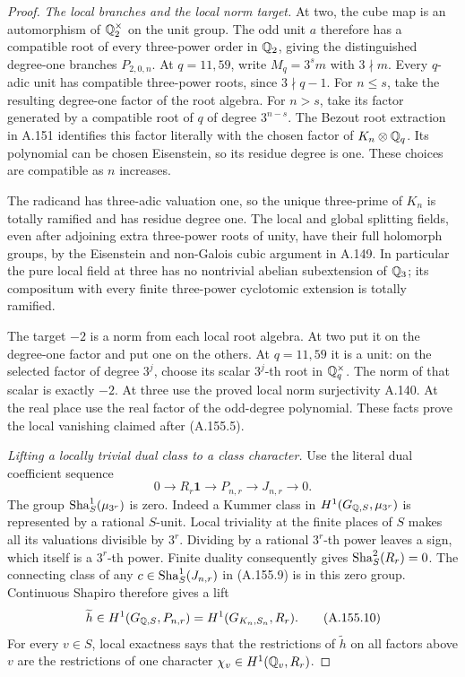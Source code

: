\begin{proof}
\emph{The local branches and the local norm target.}
At two, the cube map is an automorphism of \(\mathbb Q_2^\times\)
on the unit group.  The odd unit \(a\) therefore has a compatible
root of every three-power order in \(\mathbb Q_2\), giving the distinguished
degree-one branches \(P_{2,0,n}\).
At \(q=11,59\), write \(M_q=3^s m\) with \(3\nmid m\).
Every \(q\)-adic unit has compatible three-power roots, since
\(3\nmid q-1\).
For \(n\leq s\), take the resulting degree-one factor of the
root algebra.  For \(n>s\), take its factor generated by a compatible
root of \(q\) of degree \(3^{n-s}\).
The Bezout root extraction in A.151 identifies this factor literally
with the chosen factor of \(K_n\otimes\mathbb Q_q\).
Its polynomial can be chosen Eisenstein, so its residue degree is
one.  These choices are compatible as \(n\) increases.

The radicand has three-adic valuation one, so the unique three-prime
of \(K_n\) is totally ramified and has residue degree one.
The local and global splitting fields, even after adjoining extra
three-power roots of unity, have their full holomorph groups, by the
Eisenstein and non-Galois cubic argument in A.149.
In particular the pure local field at three has no nontrivial
abelian subextension of \(\mathbb Q_3\); its compositum with every finite
three-power cyclotomic extension is totally ramified.

The target \(-2\) is a norm from each local root algebra.
At two put it on the degree-one factor and put one on the others.
At \(q=11,59\) it is a unit: on the selected factor of degree
\(3^j\), choose its scalar \(3^j\)-th root in \(\mathbb Q_q^\times\).
The norm of that scalar is exactly \(-2\).
At three use the proved local norm surjectivity A.140.
At the real place use the real factor of the odd-degree polynomial.
These facts prove the local vanishing claimed after (A.155.5).

\emph{Lifting a locally trivial dual class to a class character.}
Use the literal dual coefficient sequence
\[
              0\longrightarrow R_r\mathbf1\longrightarrow
                    P_{n,r}\longrightarrow J_{n,r}\longrightarrow0.
\tag{A.155.9}
\]
The group \(\operatorname{Sha}^1_S(\mu_{3^r})\) is zero.
Indeed a Kummer class in \(H^1(G_{\mathbb Q,S},\mu_{3^r})\) is represented
by a rational \(S\)-unit.  Local triviality at the finite places of
\(S\) makes all its valuations divisible by \(3^r\).
Dividing by a rational \(3^r\)-th power leaves a sign, which itself
is a \(3^r\)-th power.
Finite duality \cite[I, Theorem 4.10(a)]{BIR_MilneADT} consequently
gives \(\operatorname{Sha}^2_S(R_r)=0\).
The connecting class of any \(c\in\operatorname{Sha}^1_S(J_{n,r})\) in
(A.155.9) is in this zero group.
Continuous Shapiro therefore gives a lift
\[
       \widetilde h\in H^1(G_{\mathbb Q,S},P_{n,r})
                  =H^1(G_{K_n,S_n},R_r).
\tag{A.155.10}
\]
For every \(v\in S\), local exactness says that the restrictions
of \(\widetilde h\) on all factors above \(v\) are the restrictions
of one character \(\chi_v\in H^1(\mathbb Q_v,R_r)\).


\end{proof}
